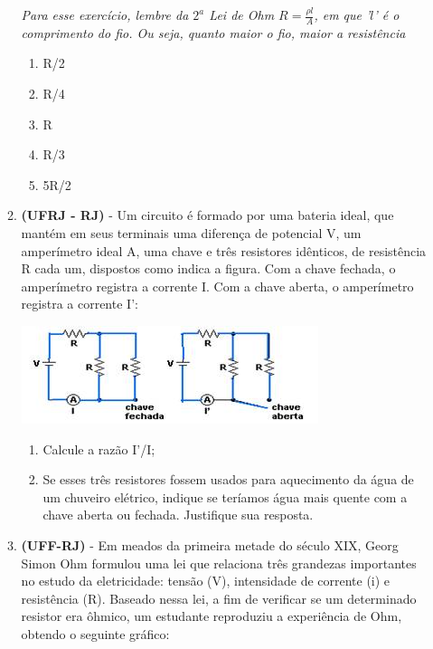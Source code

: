 \documentclass[12pt,letterpaper,fleqn]{article}
\begin{document}
\begin{itemize}
\begin{enumerate}
            \textit{Para esse exercício, lembre da $2^a$ Lei de Ohm $R = \frac{\rho l}{A}$, em que '$l$' é o comprimento do fio. Ou seja, quanto maior o fio, maior a resistência}
            
            \begin{enumerate}
                \item R/2 
                \item R/4
                \item R
                \item R/3
                \item 5R/2
            \end{enumerate}
            \pagebreak
            
            \item \textbf{(UFRJ - RJ)} - Um circuito é formado por uma bateria ideal, que mantém em seus terminais uma diferença de potencial V, um amperímetro ideal A, uma chave e três resistores idênticos, de resistência R cada um, dispostos como indica a figura. Com a chave fechada, o amperímetro registra a corrente I. Com a chave aberta, o amperímetro registra a corrente I’:
            
            \includegraphics[]{circuitos_ufrj_16.jpg}
            
            \begin{enumerate}
                \item Calcule a razão I'/I;
                \item Se esses três resistores fossem usados para aquecimento da água de um chuveiro elétrico, indique se teríamos água mais quente com a chave aberta ou fechada. Justifique sua resposta.
            \end{enumerate}
            
            \item \textbf{(UFF-RJ)} - Em meados da primeira metade do século XIX, Georg Simon Ohm formulou uma lei que relaciona três grandezas importantes no estudo da eletricidade: tensão (V), intensidade de corrente (i) e resistência (R). Baseado nessa lei, a fim de verificar se um determinado resistor era ôhmico, um estudante reproduziu a experiência de Ohm, obtendo o seguinte gráfico:
            

\end{enumerate}
\end{itemize}
\end{document}
